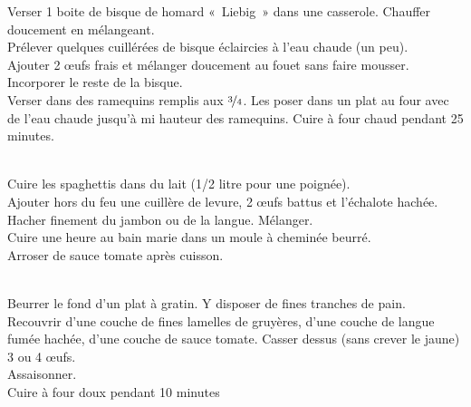 \begin{minipage}[c]{\textwidth}
Verser 1 boite de bisque de homard « Liebig » dans une casserole. Chauffer doucement en mélangeant. \\
Prélever quelques cuillérées de bisque éclaircies à l’eau chaude (un peu).\\
Ajouter 2 œufs frais et mélanger doucement au fouet sans faire mousser. \\
Incorporer le reste de la bisque. \\
Verser dans des ramequins remplis aux $\nicefrac{3}{4}$. Les poser dans un plat au four avec de l’eau chaude jusqu’à mi hauteur des ramequins. Cuire à four chaud pendant 25 minutes. \\
\\

\end{minipage}

\begin{minipage}[c]{\textwidth}
Cuire les spaghettis dans du lait (1/2 litre pour une poignée).\\
Ajouter hors du feu une cuillère de levure, 2 œufs battus et l’échalote hachée.\\
Hacher finement du jambon ou de la langue. Mélanger.\\
Cuire une heure au bain marie dans un moule à cheminée beurré. \\
Arroser de sauce tomate après cuisson. \\
\\

\end{minipage}

\begin{minipage}[c]{\textwidth}
Beurrer le fond d’un plat à gratin. Y disposer de fines tranches de pain. \\
Recouvrir d’une couche de fines lamelles de gruyères, d’une couche de langue fumée hachée, d’une couche de sauce tomate. Casser dessus (sans crever le jaune) 3 ou 4 œufs. \\
Assaisonner. \\
Cuire à four doux pendant 10 minutes\\
\\

\end{minipage}

